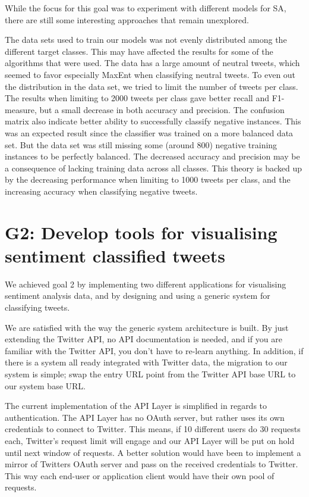 While the focus for this goal was to experiment with different models for SA, there are still some interesting approaches that remain unexplored. 

The data sets used to train our models was not evenly distributed among the different target classes. This may have affected the results for some of the algorithms that were used. The data has a large amount of neutral tweets, which seemed to favor especially MaxEnt when classifying neutral tweets. To even out the distribution in the data set, we tried to limit the number of tweets per class. The results when limiting to 2000 tweets per class gave better recall and F1-measure, but a small decrease in both accuracy and precision. The confusion matrix also indicate better ability to successfully classify negative instances. This was an expected result since the classifier was trained on a more balanced data set. But the data set was still missing some (around 800) negative training instances to be perfectly balanced. The decreased accuracy and precision may be a consequence of lacking training data across all classes. This theory is backed up by the decreasing performance when limiting to 1000 tweets per class, and the increasing accuracy when classifying negative tweets. 


\section{G2: Develop tools for visualising sentiment classified tweets}

We achieved goal 2 by implementing two different applications for visualising sentiment analysis data, and by designing and using a generic system for classifying tweets. 

We are satisfied with the way the generic system architecture is built. By just extending the Twitter API, no API documentation is needed, and if you are familiar with the Twitter API, you don't have to re-learn anything. In addition, if there is a system all ready integrated with Twitter data, the migration to our system is simple; swap the entry URL point from the Twitter API base URL to our system base URL. 

The current implementation of the API Layer is simplified in regards to authentication. The API Layer has no OAuth server, but rather uses its own credentials to connect to Twitter. This means, if 10 different users do 30 requests each, Twitter's request limit will engage and our API Layer will be put on hold until next window of requests. A better solution would have been to implement a mirror of Twitters OAuth server and pass on the received credentials to Twitter. This way each end-user or application client would have their own pool of requests. 

